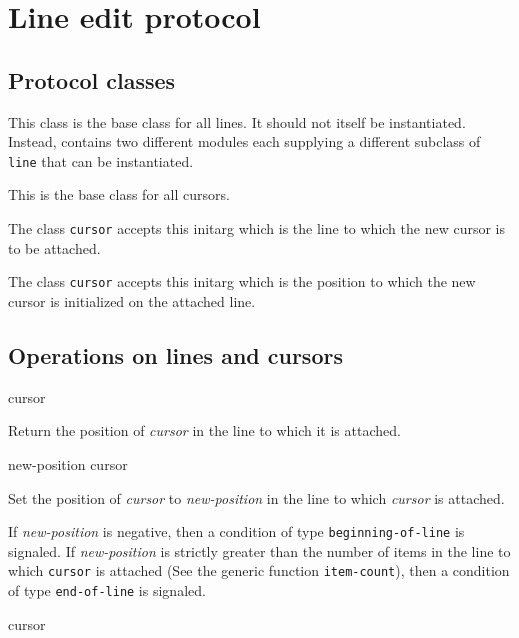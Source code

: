 \section{Line edit protocol}
\label{sec-edit-protocol}

\subsection{Protocol classes}


This class is the base class for all lines.  It should not itself be
instantiated.  Instead, \sysname{} contains two different modules
each supplying a different subclass of \texttt{line} that can be
instantiated.


This is the base class for all cursors.


The class \texttt{cursor} accepts this initarg which is the line to
which the new cursor is to be attached.


The class \texttt{cursor} accepts this initarg which is the position to
which the new cursor is initialized on the attached line.

\subsection{Operations on lines and cursors}

 {cursor}

Return the position of \textit{cursor} in the line to which it is
attached.

\ifdetached{}

 {new-position cursor}

Set the position of \textit{cursor} to \textit{new-position} in the line
to which \textit{cursor} is attached.

\ifdetached{}

If \textit{new-position} is negative, then a condition of type
\texttt{beginning-of-line} is signaled.  If \textit{new-position} is
strictly greater than the number of items in the line to which
\texttt{cursor} is attached (See the generic function
\texttt{item-count}), then a condition of type \texttt{end-of-line} is
signaled.

 {cursor}

